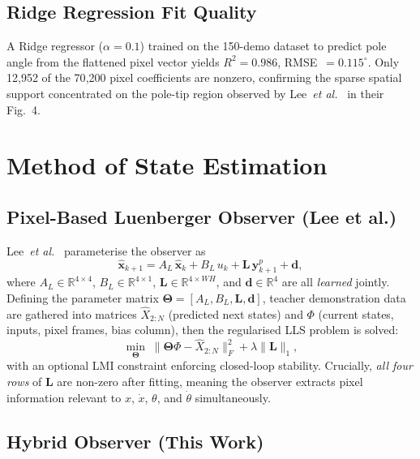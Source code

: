 \documentclass[conference]{IEEEtran}
\newcommand{\by}{\bm{y}}
\newcommand{\bxhat}{\hat{\bm{x}}}
\newcommand{\AL}{A_L}
\newcommand{\BL}{B_L}
\newcommand{\Lmat}{\bm{L}}
\newcommand{\R}{\mathbb{R}}
\begin{document}
\subsection{Ridge Regression Fit Quality}

A Ridge regressor ($\alpha=0.1$) trained on the 150-demo dataset to predict
pole angle from the flattened pixel vector yields $R^2=0.986$,
RMSE~$=0.115^\circ$.  Only 12{,}952 of the 70{,}200 pixel coefficients are
nonzero, confirming the sparse spatial support concentrated on the pole-tip
region observed by Lee~\emph{et al.}~\cite{lee2024} in their Fig.~4.

\section{Method of State Estimation}
\label{sec:method}

\subsection{Pixel-Based Luenberger Observer (Lee et al.)}

Lee~\emph{et al.}~\cite{lee2024} parameterise the observer as
\begin{equation}
  \bxhat_{k+1} = \AL\,\bxhat_k + \BL\,u_k + \Lmat\,\by^p_{k+1} + \bm{d},
  \label{eq:obs_lee}
\end{equation}
where $\AL\in\R^{4\times4}$, $\BL\in\R^{4\times1}$,
$\Lmat\in\R^{4\times WH}$, and $\bm{d}\in\R^4$ are all \emph{learned}
jointly.  Defining the parameter matrix
$\bm{\Theta}=[\AL,\BL,\Lmat,\bm{d}]$, teacher demonstration data are gathered
into matrices $\hat{X}_{2:N}$ (predicted next states) and $\Phi$ (current
states, inputs, pixel frames, bias column), then the regularised LLS problem is
solved:
\begin{equation}
  \min_{\bm{\Theta}}\;
  \|\bm{\Theta}\Phi - \hat{X}_{2:N}\|_F^2
  + \lambda\|\Lmat\|_1,
  \label{eq:lls}
\end{equation}
with an optional LMI constraint enforcing closed-loop stability.  Crucially,
\emph{all four rows} of $\Lmat$ are non-zero after fitting, meaning the
observer extracts pixel information relevant to $x$, $\dot x$, $\theta$, and
$\dot\theta$ simultaneously.

\subsection{Hybrid Observer (This Work)}
\end{document}
